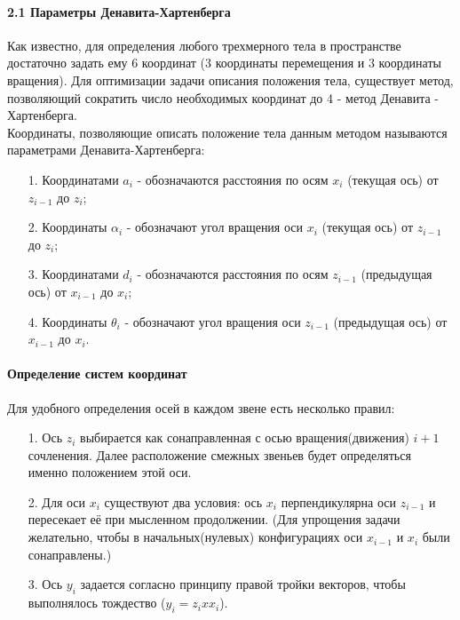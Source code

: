 \paragraph*{2.1 Параметры Денавита-Хартенберга\\}

\hspace*{\parindent}Как известно, для определения любого трехмерного тела в пространстве достаточно задать ему 6 координат (3 координаты перемещения и 3 координаты вращения). Для оптимизации задачи описания положения тела, существует метод, позволяющий сократить число необходимых координат до 4 - метод Денавита - Хартенберга.\\

\hspace*{\parindent}Координаты, позволяющие описать положение тела данным методом называются параметрами Денавита-Хартенберга:
\begin{enumerate} 
 \item[1.] Координатами $a_i$ - обозначаются расстояния по осям $x_i$ (текущая ось) от  $z_{i-1}$ до $z_i$;
 \item[2.] Координаты $\alpha_i$ - обозначают угол вращения оси $x_i$ (текущая ось) от  $z_{i-1}$ до $z_i$;
 \item[3.] Координатами $d_i$ - обозначаются расстояния по осям $z_{i-1}$ (предыдущая ось) от  $x_{i-1}$ до $x_i$;
 \item[4.] Координаты $\theta_i$ - обозначают угол вращения оси $z_{i-1}$ (предыдущая ось) от  $x_{i-1}$ до $x_i$.\\
 \end{enumerate}
 
 \paragraph*{Определение систем координат\\}
 
\hspace*{\parindent}Для удобного определения осей в каждом звене есть несколько правил:
\begin{enumerate} 
\item[1.] Ось $z_i$ выбирается как сонаправленная с осью вращения(движения) $i+1$ сочленения. Далее расположение смежных звеньев будет определяться именно положением этой оси.
\item[2.] Для оси $x_i$ существуют два условия: ось $x_i$ перпендикулярна оси $z_{i-1}$ и пересекает её при мысленном продолжении. (Для упрощения задачи желательно, чтобы в начальных(нулевых) конфигурациях оси $x_{i-1}$ и $x_i$ были сонаправлены.)
\item[3.] Ось $y_i$ задается согласно принципу правой тройки векторов, чтобы выполнялось тождество ($y_i = z_i x x_i$).
 \end{enumerate}

